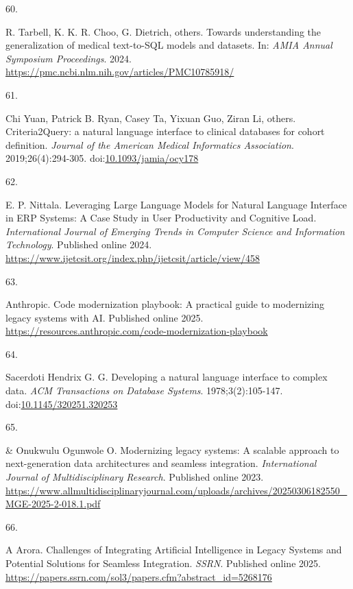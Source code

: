 \documentclass[
  american,
  11pt,
  letterpaper,
  oneside  ,captions=tableheading
]{scrartcl}
\newlength{\cslhangindent}
\newlength{\csllabelwidth}
\newenvironment{CSLReferences}[2] %
 {\begin{list}{}{%
  \setlength{\itemindent}{0pt}
  \setlength{\leftmargin}{0pt}
  \setlength{\parsep}{0pt}
  \ifodd #1
   \setlength{\leftmargin}{\cslhangindent}
   \setlength{\itemindent}{-1\cslhangindent}
  \fi
  \setlength{\itemsep}{#2\baselineskip}}}
 {\end{list}}
\newcommand{\CSLLeftMargin}[1]{\parbox[t]{\csllabelwidth}{\strut#1\strut}}
\newcommand{\CSLRightInline}[1]{\parbox[t]{\linewidth - \csllabelwidth}{\strut#1\strut}}
\begin{document}
\begin{CSLReferences}{0}{1}
\CSLLeftMargin{60. }%
\CSLRightInline{R. Tarbell, K. K. R. Choo, G. Dietrich, others. {Towards
understanding the generalization of medical text-to-SQL models and
datasets}. In: \emph{AMIA Annual Symposium Proceedings}. 2024.
\url{https://pmc.ncbi.nlm.nih.gov/articles/PMC10785918/}}

\CSLLeftMargin{61. }%
\CSLRightInline{Chi Yuan, Patrick B. Ryan, Casey Ta, Yixuan Guo, Ziran
Li, others. {Criteria2Query: a natural language interface to clinical
databases for cohort definition}. \emph{Journal of the American Medical
Informatics Association}. 2019;26(4):294-305.
doi:\href{https://doi.org/10.1093/jamia/ocy178}{10.1093/jamia/ocy178}}

\CSLLeftMargin{62. }%
\CSLRightInline{E. P. Nittala. {Leveraging Large Language Models for
Natural Language Interface in ERP Systems: A Case Study in User
Productivity and Cognitive Load}. \emph{International Journal of
Emerging Trends in Computer Science and Information Technology}.
Published online 2024.
\url{https://www.ijetcsit.org/index.php/ijetcsit/article/view/458}}

\CSLLeftMargin{63. }%
\CSLRightInline{Anthropic. {Code modernization playbook: A practical
guide to modernizing legacy systems with {AI}}. Published online 2025.
\url{https://resources.anthropic.com/code-modernization-playbook}}

\CSLLeftMargin{64. }%
\CSLRightInline{Sacerdoti Hendrix G. G. {Developing a natural language
interface to complex data}. \emph{{ACM} Transactions on Database
Systems}. 1978;3(2):105-147.
doi:\href{https://doi.org/10.1145/320251.320253}{10.1145/320251.320253}}

\CSLLeftMargin{65. }%
\CSLRightInline{\& Onukwulu Ogunwole O. {Modernizing legacy systems: A
scalable approach to next-generation data architectures and seamless
integration}. \emph{International Journal of Multidisciplinary
Research}. Published online 2023.
\url{https://www.allmultidisciplinaryjournal.com/uploads/archives/20250306182550_MGE-2025-2-018.1.pdf}}

\CSLLeftMargin{66. }%
\CSLRightInline{A Arora. {Challenges of Integrating Artificial
Intelligence in Legacy Systems and Potential Solutions for Seamless
Integration}. \emph{{SSRN}}. Published online 2025.
\url{https://papers.ssrn.com/sol3/papers.cfm?abstract_id=5268176}}


\end{CSLReferences}
\end{document}
